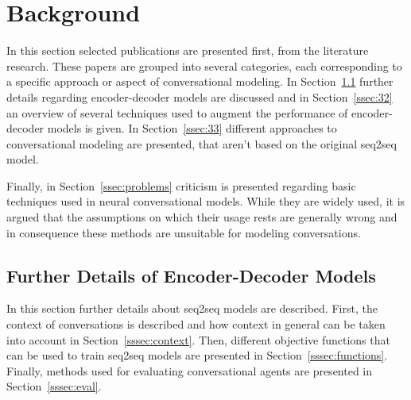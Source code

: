 \documentclass[12pt]{article}
\begin{document}
\newpage\section{Background} \label{sec:background}
In this section selected publications are presented first, from the literature research. These papers are grouped into several categories, each corresponding to a specific approach or aspect of conversational modeling. In Section~\ref{ssec:31} further details regarding encoder-decoder models are discussed and in Section~\ref{ssec:32} an overview of several techniques used to augment the performance of encoder-decoder models is given. In Section~\ref{ssec:33} different approaches to conversational modeling are presented, that aren't based on the original seq2seq model.

Finally, in Section~\ref{ssec:problems} criticism is presented regarding basic techniques used in neural conversational models. While they are widely used, it is argued that the assumptions on which their usage rests are generally wrong and in consequence these methods are unsuitable for modeling conversations.

\subsection{Further Details of Encoder-Decoder Models} \label{ssec:31}
In this section further details about seq2seq models are described. First, the context of conversations is described and how context in general can be taken into account in Section~\ref{sssec:context}. Then, different objective functions that can be used to train seq2seq models are presented in Section~\ref{sssec:functions}. Finally, methods used for evaluating conversational agents are presented in Section~\ref{sssec:eval}.
\end{document}
